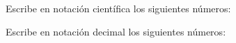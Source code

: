 \documentclass[12pt,addpoints]{evalua}
\begin{document}
\begin{questions}
\begin{multicols}{3}
      \end{multicols}

      \newpage
      \question[4] Escribe en notación científica los siguientes números:
     
      \begin{multicols}{2}
      \end{multicols}
      \question[4] Escribe en notación decimal los siguientes números:
   
      \begin{multicols}{2}
      \end{multicols}


\end{questions}
\end{document}
